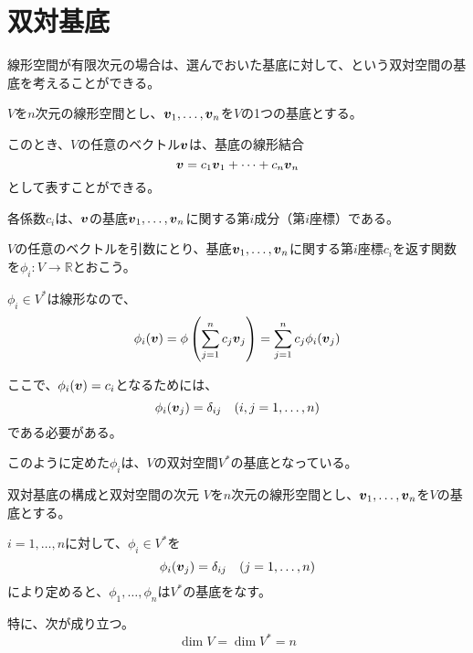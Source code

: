 \documentclass[../../../topic_linear-algebra]{subfiles}
\begin{document}
\sectionline
\section{双対基底}

線形空間が有限次元の場合は、選んでおいた基底に対して、という双対空間の基底を考えることができる。

\br

$V$を$n$次元の線形空間とし、$\vb*{v}_1,\ldots,\vb*{v}_n$を$V$の1つの基底とする。

このとき、$V$の任意のベクトル$\vb*{v}$は、基底の線形結合
\begin{equation*}
  \vb*{v} = c_1 \vb*{v}_1 + \cdots + c_n \vb*{v}_n
\end{equation*}
として表すことができる。

各係数$c_i$は、$\vb*{v}$の基底$\vb*{v}_1,\ldots,\vb*{v}_n$に関する第$i$成分（第$i$座標）である。

\br

$V$の任意のベクトルを引数にとり、基底$\vb*{v}_1,\ldots,\vb*{v}_n$に関する第$i$座標$c_i$を返す関数を$\phi_i \colon V \to \mathbb{R}$とおこう。

$\phi_i \in V^*$は線形なので、
\begin{equation*}
  \phi_i(\vb*{v}) = \phi\left(\sum_{j=1}^{n} c_j \vb*{v}_j\right) = \sum_{j=1}^{n} c_j \phi_i(\vb*{v}_j)
\end{equation*}

ここで、$\phi_i(\vb*{v})= c_i$となるためには、
\begin{equation*}
  \phi_i(\vb*{v}_j) = \delta_{ij} \quad (i,j=1,\ldots,n)
\end{equation*}
である必要がある。

\br

このように定めた$\phi_i$は、$V$の双対空間$V^*$の基底となっている。

\begin{theorem}{双対基底の構成と双対空間の次元}\label{thm:dual-basis-dimension}
  $V$を$n$次元の線形空間とし、$\vb*{v}_1,\ldots,\vb*{v}_n$を$V$の基底とする。
  
  $i = 1,\dots, n$に対して、$\phi_i \in V^*$を
  \begin{equation*}
    \phi_i(\vb*{v}_j) = \delta_{ij} \quad (j=1,\ldots,n)
  \end{equation*}
  により定めると、$\phi_1,\ldots,\phi_n$は$V^*$の基底をなす。
  
  特に、次が成り立つ。
  \begin{equation*}
    \dim V = \dim V^* = n
  \end{equation*}
\end{theorem}
\end{document}
